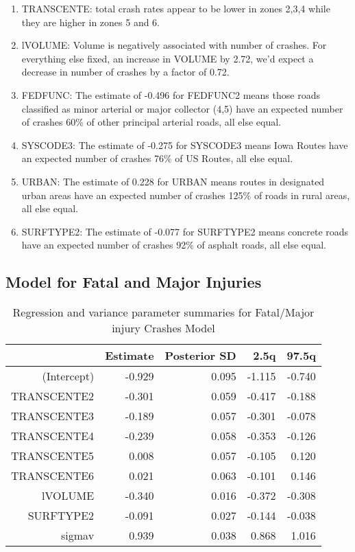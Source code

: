 \documentclass[a4paper]{article}\usepackage[]{graphicx}\usepackage[]{color}
\begin{document}
\begin{enumerate}
\item
TRANSCENTE: total crash rates appear to be lower in zones 2,3,4 while they are higher in zones 5 and 6. 

\item
lVOLUME: Volume is negatively associated with number of crashes. For everything else fixed, an increase in VOLUME by 2.72, we'd expect a decrease in number of crashes by a factor of 0.72.

\item
FEDFUNC: The estimate of -0.496 for FEDFUNC2 means those roads classified as minor arterial or major collector (4,5) have an expected number of crashes 60\% of other principal arterial roads, all else equal. 

\item
SYSCODE3: The estimate of -0.275 for SYSCODE3 means Iowa Routes have an expected number of crashes 76\% of US Routes, all else equal.

\item
URBAN: The estimate of 0.228 for URBAN means routes in designated urban areas have an expected number of crashes 125\% of roads in rural areas, all else equal.

\item
SURFTYPE2: The estimate of -0.077 for SURFTYPE2 means concrete roads have an expected number of crashes 92\% of asphalt roads, all else equal.

\end{enumerate}

\clearpage
\subsection{Model for Fatal and Major Injuries}


\begin{table}[h!]
\centering
\begin{tabular}{rrrrr}
  \hline
 & Estimate & Posterior SD & 2.5q & 97.5q \\ 
  \hline
(Intercept) & -0.929 & 0.095 & -1.115 & -0.740 \\ 
  TRANSCENTE2 & -0.301 & 0.059 & -0.417 & -0.188 \\ 
  TRANSCENTE3 & -0.189 & 0.057 & -0.301 & -0.078 \\ 
  TRANSCENTE4 & -0.239 & 0.058 & -0.353 & -0.126 \\ 
  TRANSCENTE5 & 0.008 & 0.057 & -0.105 & 0.120 \\ 
  TRANSCENTE6 & 0.021 & 0.063 & -0.101 & 0.146 \\ 
  lVOLUME & -0.340 & 0.016 & -0.372 & -0.308 \\ 
  SURFTYPE2 & -0.091 & 0.027 & -0.144 & -0.038 \\ 
  sigmav & 0.939 & 0.038 & 0.868 & 1.016 \\ 
   \hline
\end{tabular}
\caption{Regression and variance parameter summaries for Fatal/Major injury Crashes Model} 
\label{fatmajcrash}
\end{table}
\end{document}
